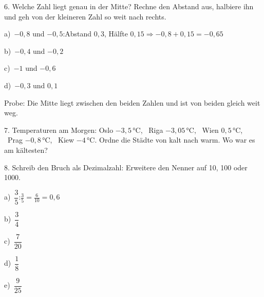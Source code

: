 \documentclass[11pt]{article}
\newcommand{\grau}[1]{{\color{mbgrau}#1}}
\begin{document}
\begin{pfaufg}{}{6.}{}
Welche Zahl liegt genau in der Mitte? Rechne den Abstand aus, halbiere ihn und geh von der kleineren Zahl so weit nach rechts.\par\smallskip
\grau{a)\ $-0{,}8$ und $-0{,}5$:\quad Abstand $0{,}3$, Hälfte $0{,}15$\quad$\Rightarrow$\quad $-0{,}8 + 0{,}15 = -0{,}65$}\par\medskip
\noindent\begin{minipage}[t]{0.48\linewidth}\raggedright
b)\ $-0{,}4$ und $-0{,}2$
\end{minipage}\hfill
\begin{minipage}[t]{0.48\linewidth}\raggedright
c)\ $-1$ und $-0{,}6$
\end{minipage}\par\smallskip
\noindent\begin{minipage}[t]{0.48\linewidth}\raggedright
d)\ $-0{,}3$ und $0{,}1$
\end{minipage}\par\smallskip
\par{\small Probe: Die Mitte liegt zwischen den beiden Zahlen und ist von beiden gleich weit weg.}
\end{pfaufg}

\begin{pfaufg}{}{7.}{}
Temperaturen am Morgen: Oslo $-3{,}5$\,°C, \ Riga $-3{,}05$\,°C, \ Wien $0{,}5$\,°C, \ Prag $-0{,}8$\,°C, \ Kiew $-4$\,°C. Ordne die Städte von kalt nach warm. Wo war es am kältesten?
\end{pfaufg}

\begin{pfaufg}{}{8.}{}
Schreib den Bruch als Dezimalzahl: Erweitere den Nenner auf 10, 100 oder 1000.\par\smallskip
\grau{a)\ $\dfrac{3}{5}$:\quad $\frac{3}{5} = \frac{6}{10} = 0{,}6$}\par\medskip
\noindent\begin{minipage}[t]{0.48\linewidth}\raggedright
b)\ $\dfrac{3}{4}$
\end{minipage}\hfill
\begin{minipage}[t]{0.48\linewidth}\raggedright
c)\ $\dfrac{7}{20}$
\end{minipage}\par\smallskip
\noindent\begin{minipage}[t]{0.48\linewidth}\raggedright
d)\ $\dfrac{1}{8}$
\end{minipage}\hfill
\begin{minipage}[t]{0.48\linewidth}\raggedright
e)\ $\dfrac{9}{25}$
\end{minipage}\par\smallskip
{}
\end{pfaufg}
\end{document}

